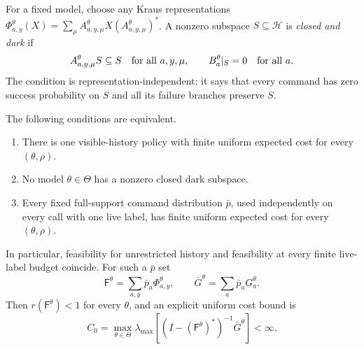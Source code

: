 For a fixed model, choose any Kraus representations
$\Phi^\theta_{a,y}(X)=\sum_\mu
 A^\theta_{a,y,\mu}X(A^\theta_{a,y,\mu})^*$.
A nonzero subspace $S\subseteq\mathcal H$ is \emph{closed and dark}
if
\begin{equation}\label{eq:r79-dark-subspace}
 A^\theta_{a,y,\mu}S\subseteq S\quad\hbox{for all }a,y,\mu,
 \qquad B^\theta_a|_S=0\quad\hbox{for all }a.
\end{equation}
The condition is representation-independent: it says that every
command has zero success probability on $S$ and all its failure
branches preserve $S$.

\begin{theorem}
\label{thm:r79-dark-feasibility}
The following conditions are equivalent.
\begin{enumerate}
\item There is one visible-history policy with finite uniform
expected cost for every $(\theta,\rho)$.
\item No model $\theta\in\Theta$ has a nonzero closed dark subspace.
\item Every fixed full-support command distribution $\bar p$,
used independently on every call with one live label, has finite
uniform expected cost for every $(\theta,\rho)$.
\end{enumerate}
In particular, feasibility for unrestricted history and feasibility
at every finite live-label budget coincide.  For such a $\bar p$ set
\[
 \mathsf F^\theta=\sum_{a,y}\bar p_a\Phi^\theta_{a,y},
 \qquad \bar G^\theta=\sum_a\bar p_aG^\theta_a.
\]
Then $r(\mathsf F^\theta)<1$ for every $\theta$, and an explicit
uniform cost bound is
\begin{equation}\label{eq:r79-fallback-cap}
 C_0=\max_{\theta\in\Theta}
       \lambda_{\max}\!\left[
          (I-(\mathsf F^\theta)^*)^{-1}\bar G^\theta\right]<\infty.
\end{equation}
\end{theorem}
